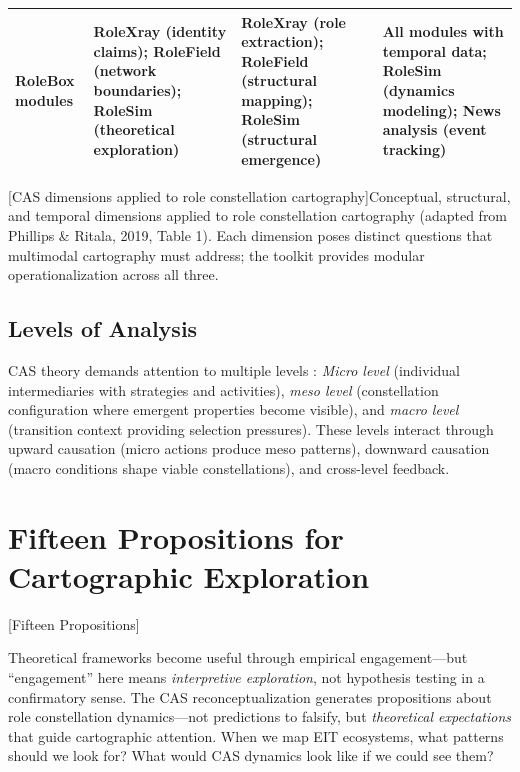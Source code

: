 \documentclass[../main.tex]{subfiles}
\begin{document}
\begin{wideblock}
\begin{center}
\begin{tabular}{@{}p{2.2cm}p{3.8cm}p{3.8cm}p{3.8cm}@{}}
\addlinespace
\textbf{RoleBox modules} &
RoleXray (identity claims); RoleField (network boundaries); RoleSim (theoretical exploration) &
RoleXray (role extraction); RoleField (structural mapping); RoleSim (structural emergence) &
All modules with temporal data; RoleSim (dynamics modeling); News analysis (event tracking) \\
\bottomrule
\end{tabular}
[CAS dimensions applied to role constellation cartography]{Conceptual, structural, and temporal dimensions applied to role constellation cartography (adapted from Phillips \& Ritala, 2019, Table 1). Each dimension poses distinct questions that multimodal cartography must address; the \RoleBox{} toolkit provides modular operationalization across all three.}
\end{center}
\end{wideblock}

\subsection{Levels of Analysis}

CAS theory demands attention to multiple levels \parencite{simon1962architecture}: \textit{Micro level} (individual intermediaries with strategies and activities), \textit{meso level} (constellation configuration where emergent properties become visible), and \textit{macro level} (transition context providing selection pressures). These levels interact through upward causation (micro actions produce meso patterns), downward causation (macro conditions shape viable constellations), and cross-level feedback.


\section{Fifteen Propositions for Cartographic Exploration}[Fifteen Propositions]

Theoretical frameworks become useful through empirical engagement---but ``engagement'' here means \textit{interpretive exploration}, not hypothesis testing in a confirmatory sense. The CAS reconceptualization generates propositions about role constellation dynamics---not predictions to falsify, but \textit{theoretical expectations} that guide cartographic attention. When we map EIT ecosystems, what patterns should we look for? What would CAS dynamics look like if we could see them?
\end{document}
